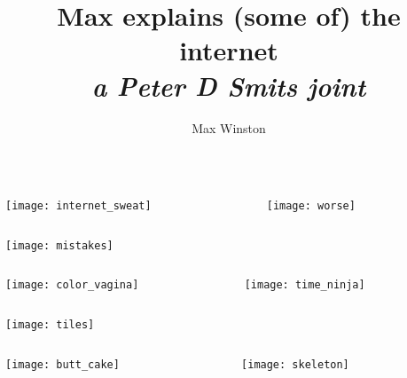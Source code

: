\documentclass{beamer}
\title{Max explains (some of) the internet\\
\small{\textit{a Peter D Smits joint}}}
\author{Max Winston}
\begin{document}
\begin{frame}
  \maketitle
\end{frame}

\begin{frame}
  \begin{columns}
    \begin{column}{0.5\textwidth}
      \texttt{[image: internet\_sweat]}
    \end{column}
    \begin{column}{0.5\textwidth}
      \texttt{[image: worse]}
    \end{column}
  \end{columns}

\end{frame}

\begin{frame}
  \texttt{[image: mistakes]}

\end{frame}

\begin{frame}
  \begin{columns}
    \begin{column}{0.5\textwidth}
      \texttt{[image: color\_vagina]}
    \end{column}
    \begin{column}{0.5\textwidth}
      \texttt{[image: time\_ninja]}
    \end{column}
  \end{columns}
\end{frame}

\begin{frame}
  \texttt{[image: tiles]}

\end{frame}

\begin{frame}
  \begin{columns}
    \begin{column}{0.5\textwidth}
      \texttt{[image: butt\_cake]}
    \end{column}
    \begin{column}{0.5\textwidth}
      \texttt{[image: skeleton]}
    \end{column}
  \end{columns}
\end{frame}
\end{document}

